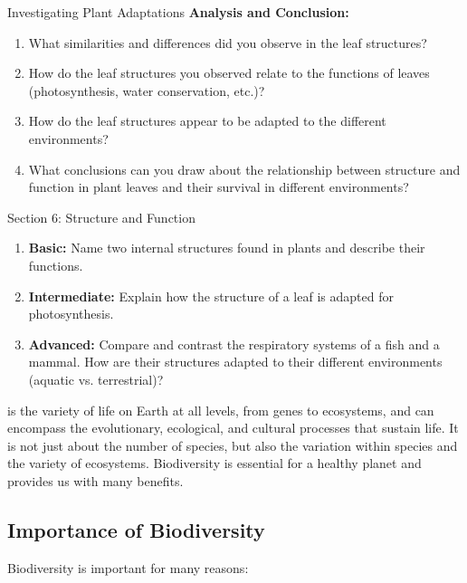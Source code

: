 \begin{investigation}{Investigating Plant Adaptations}
\textbf{Analysis and Conclusion:}
\begin{enumerate}
    \item What similarities and differences did you observe in the leaf structures?
    \item How do the leaf structures you observed relate to the functions of leaves (photosynthesis, water conservation, etc.)?
    \item How do the leaf structures appear to be adapted to the different environments?
    \item What conclusions can you draw about the relationship between structure and function in plant leaves and their survival in different environments?
\end{enumerate}
\end{investigation}


\begin{tieredquestions}{Section 6: Structure and Function}
\begin{enumerate}
    \item \textbf{Basic:} Name two internal structures found in plants and describe their functions.
    \item \textbf{Intermediate:} Explain how the structure of a leaf is adapted for photosynthesis.
    \item \textbf{Advanced:}  Compare and contrast the respiratory systems of a fish and a mammal. How are their structures adapted to their different environments (aquatic vs. terrestrial)?
\end{enumerate}
\end{tieredquestions}


\FloatBarrier

 is the variety of life on Earth at all levels, from genes to ecosystems, and can encompass the evolutionary, ecological, and cultural processes that sustain life. It is not just about the number of species, but also the variation within species and the variety of ecosystems.  Biodiversity is essential for a healthy planet and provides us with many benefits.

\subsection{Importance of Biodiversity}

Biodiversity is important for many reasons:

